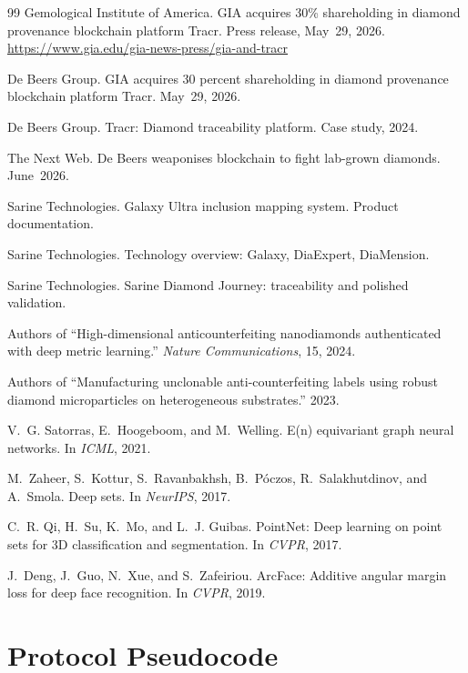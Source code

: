 \documentclass[10pt,twocolumn]{article}
\theoremstyle{remark}
\begin{document}
\begin{thebibliography}{99}
 Gemological Institute of America. GIA acquires 30\%
shareholding in diamond provenance blockchain platform Tracr. Press release,
May~29, 2026. \url{https://www.gia.edu/gia-news-press/gia-and-tracr}

 De Beers Group. GIA acquires 30 percent shareholding in
diamond provenance blockchain platform Tracr. May~29, 2026.

 De Beers Group. Tracr: Diamond traceability
platform. Case study, 2024.

 The Next Web. De Beers weaponises blockchain to fight
lab-grown diamonds. June~2026.

 Sarine Technologies. Galaxy Ultra inclusion mapping
system. Product documentation.

 Sarine Technologies. Technology overview: Galaxy,
DiaExpert, DiaMension.

 Sarine Technologies. Sarine Diamond Journey:
traceability and polished validation.

 Authors of ``High-dimensional anticounterfeiting
nanodiamonds authenticated with deep metric learning.'' \emph{Nature
Communications}, 15, 2024.

 Authors of ``Manufacturing unclonable anti-counterfeiting
labels using robust diamond microparticles on heterogeneous substrates.'' 2023.

 V.~G. Satorras, E.~Hoogeboom, and M.~Welling. E(n)
equivariant graph neural networks. In \emph{ICML}, 2021.

 M.~Zaheer, S.~Kottur, S.~Ravanbakhsh, B.~P\'oczos,
R.~Salakhutdinov, and A.~Smola. Deep sets. In \emph{NeurIPS}, 2017.

 C.~R. Qi, H.~Su, K.~Mo, and L.~J. Guibas. PointNet: Deep
learning on point sets for 3D classification and segmentation. In \emph{CVPR},
2017.

 J.~Deng, J.~Guo, N.~Xue, and S.~Zafeiriou. ArcFace: Additive
angular margin loss for deep face recognition. In \emph{CVPR}, 2019.

\end{thebibliography}

\onecolumn
\appendix

\section{Protocol Pseudocode}
\end{document}
